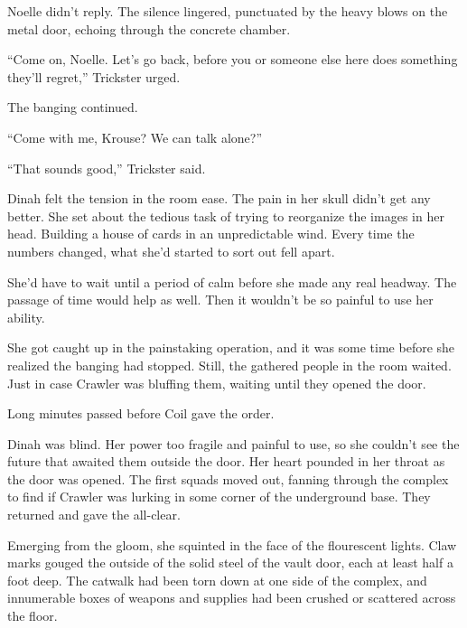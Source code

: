 Noelle didn't reply.  The silence lingered, punctuated by the heavy blows on the metal door, echoing through the concrete chamber.



``Come on, Noelle.  Let's go back, before you or someone else here does something they'll regret,'' Trickster urged.



The banging continued.



``Come with me, Krouse?  We can talk alone?''



``That sounds good,'' Trickster said.



Dinah felt the tension in the room ease.  The pain in her skull didn't get any better.  She set about the tedious task of trying to reorganize the images in her head.  Building a house of cards in an unpredictable wind.  Every time the numbers changed, what she'd started to sort out fell apart.



She'd have to wait until a period of calm before she made any real headway.  The passage of time would help as well.  Then it wouldn't be so painful to use her ability.



She got caught up in the painstaking operation, and it was some time before she realized the banging had stopped.  Still, the gathered people in the room waited.  Just in case Crawler was bluffing them, waiting until they opened the door.



Long minutes passed before Coil gave the order.



Dinah was blind.  Her power too fragile and painful to use, so she couldn't see the future that awaited them outside the door.  Her heart pounded in her throat as the door was opened.  The first squads moved out, fanning through the complex to find if Crawler was lurking in some corner of the underground base.  They returned and gave the all-clear.



Emerging from the gloom, she squinted in the face of the flourescent lights.  Claw marks gouged the outside of the solid steel of the vault door, each at least half a foot deep.  The catwalk had been torn down at one side of the complex, and innumerable boxes of weapons and supplies had been crushed or scattered across the floor.



